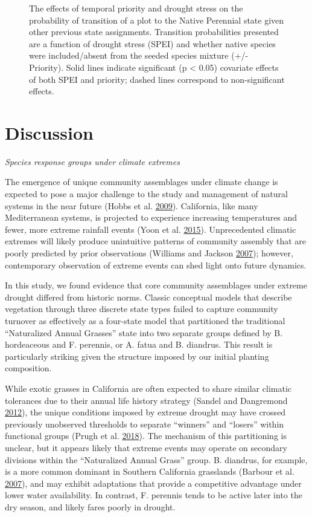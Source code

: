 \documentclass[twoside,12pt,final]{ucthesis-CA2012}
\begin{document}
\begin{ucmainmatter}
\begin{figure}
\caption{The effects of temporal priority and drought stress on the probability of transition of a plot to the Native Perennial state given other previous state assignments. Transition probabilities presented are a function of drought stress (SPEI) and whether native species were included/absent from the seeded species mixture (+/- Priority). Solid lines indicate significant (p \textless{} 0.05) covariate effects of both SPEI and priority; dashed lines correspond to non-significant effects. \label{fig-3-4}}
\end{figure}
\hypertarget{discussion}{%
\section{Discussion}\label{discussion}}

\emph{Species response groups under climate extremes}

The emergence of unique community assemblages under climate change is expected to pose a major challenge to the study and management of natural systems in the near future (Hobbs et al. \protect\hyperlink{ref-Hobbs2009}{2009}).
California, like many Mediterranean systems, is projected to experience increasing temperatures and fewer, more extreme rainfall events (Yoon et al. \protect\hyperlink{ref-Yoon2015}{2015}).
Unprecedented climatic extremes will likely produce unintuitive patterns of community assembly that are poorly predicted by prior observations (Williams and Jackson \protect\hyperlink{ref-Williams2007}{2007}); however, contemporary observation of extreme events can shed light onto future dynamics.

In this study, we found evidence that core community assemblages under extreme drought differed from historic norms.
Classic conceptual models that describe vegetation through three discrete state types failed to capture community turnover as effectively as a four-state model that partitioned the traditional ``Naturalized Annual Grasses'' state into two separate groups defined by B. hordeaceous and F. perennis, or A. fatua and B. diandrus.
This result is particularly striking given the structure imposed by our initial planting composition.

While exotic grasses in California are often expected to share similar climatic tolerances due to their annual life history strategy (Sandel and Dangremond \protect\hyperlink{ref-Sandel2012}{2012}), the unique conditions imposed by extreme drought may have crossed previously unobserved thresholds to separate ``winners'' and ``losers'' within functional groups (Prugh et al. \protect\hyperlink{ref-Prugh2018}{2018}).
The mechanism of this partitioning is unclear, but it appears likely that extreme events may operate on secondary divisions within the ``Naturalized Annual Grass'' group.
B. diandrus, for example, is a more common dominant in Southern California grasslands (Barbour et al. \protect\hyperlink{ref-Barbour2007}{2007}), and may exhibit adaptations that provide a competitive advantage under lower water availability.
In contrast, F. perennis tends to be active later into the dry season, and likely fares poorly in drought.


\end{ucmainmatter}
\end{document}
